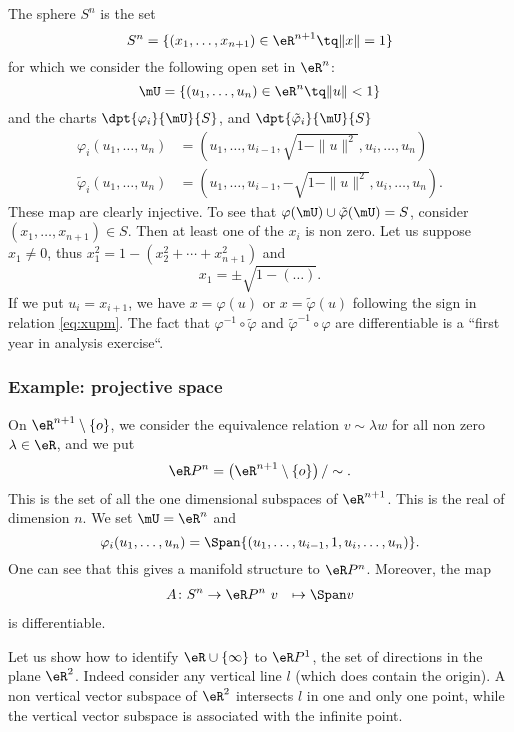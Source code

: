 The sphere $S^n$ is the set
\[
  S^n=\{  (x_1,\ldots, x_{n+1})\in\eR^{n+1}\tq \|x\|=1  \}
\]
for which we consider the following open set in $\eR^n$:
\[
   \mU=\{  (u_1,\ldots,u_n)\in\eR^n\tq\|u\|<1  \}
\]
and the charts $\dpt{\varphi_i}{\mU}{S}$, and $\dpt{\tilde{\varphi}_i}{\mU}{S}$
\begin{subequations}
\begin{align}
   \varphi_i(u_1,\ldots,u_n)&=(u_1,\ldots,u_{i-1}, \sqrt{  1-\|u\|^2  },u_i,\ldots,u_n )\\
   \tilde{\varphi}_i(u_1,\ldots,u_n)&=(u_1,\ldots,u_{i-1}, -\sqrt{  1-\|u\|^2  },u_i,\ldots,u_n ).
\end{align}
\end{subequations}
These map are clearly injective. To see that $\varphi(\mU)\cup\tilde{\varphi}(\mU)=S$, consider $(x_1,\ldots,x_{n+1})\in S$. Then at least one of the $x_i$ is non zero. Let us suppose $x_1\neq 0$, thus $x_1^2=1-(x_2^2+\cdots+x_{n+1}^2)$ and
\begin{equation}\label{eq:xupm}
   x_1=\pm\sqrt{1-(\ldots)}.
\end{equation}
If we put $u_i=x_{i+1}$, we have $x=\varphi(u)$ or $x=\tilde{\varphi}(u)$ following the sign in relation \eqref{eq:xupm}. The fact that $\varphi^{-1}\circ\tilde{\varphi}$ and $\tilde{\varphi}^{-1}\circ\varphi$ are differentiable is a ``first year in analysis exercise``.

\subsubsection{Example: projective space}

On $\eR^{n+1}\setminus\{o\}$, we consider the equivalence relation $v\sim\lambda w$ for all non zero $\lambda\in\eR$, and we put
\[
  \eR P^n=\left(\eR^{n+1}\setminus\{o\}\right)/\sim.
\]
This is the set of all the one dimensional subspaces of $\eR^{n+1}$. This is the real  of dimension $n$. We set $\mU=\eR^n$ and
\[
  \varphi_i(u_1,\ldots,u_n)=\Span\{ (u_1,\ldots,u_{i-1},1,u_i,\ldots,u_n) \}.
\]
One can see that this gives a manifold structure to $\eR P^n$. Moreover, the map
		\begin{equation}
		\begin{aligned}
			A \colon S^n &\to \eR P^n\
			v&\mapsto \Span v
		\end{aligned}
	\end{equation}
is differentiable.

Let us show how to identify $\eR\cup\{ \infty \}$ to $\eR P^1$, the set of directions in the plane $\eR^2$. Indeed consider any vertical line $l$ (which does contain the origin). A non vertical vector subspace of $\eR^2$ intersects $l$ in one and only one point, while the vertical vector subspace is associated with the infinite point.

